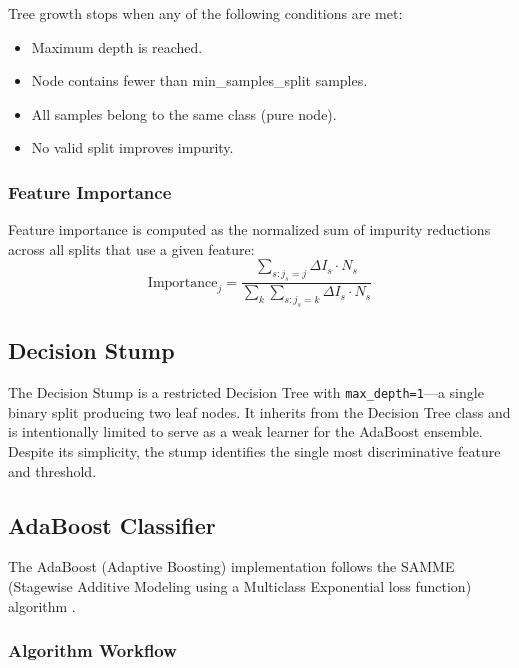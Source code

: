 \documentclass[conference,12pt]{IEEEtran}
\begin{document}
Tree growth stops when any of the following conditions are met:
\begin{itemize}
    \item Maximum depth is reached.
    \item Node contains fewer than min\_samples\_split samples.
    \item All samples belong to the same class (pure node).
    \item No valid split improves impurity.
\end{itemize}

\subsubsection{Feature Importance}

Feature importance is computed as the normalized sum of impurity reductions across all splits that use a given feature:
\begin{equation}
\text{Importance}_j = \frac{\sum_{s: j_s = j} \Delta I_s \cdot N_s}{\sum_{k} \sum_{s: j_s = k} \Delta I_s \cdot N_s}
\end{equation}

\subsection{Decision Stump}

The Decision Stump is a restricted Decision Tree with \texttt{max\_depth=1}---a single binary split producing two leaf nodes. It inherits from the Decision Tree class and is intentionally limited to serve as a weak learner for the AdaBoost ensemble. Despite its simplicity, the stump identifies the single most discriminative feature and threshold.

\subsection{AdaBoost Classifier}

The AdaBoost (Adaptive Boosting) implementation follows the SAMME (Stagewise Additive Modeling using a Multiclass Exponential loss function) algorithm \cite{hastie2009elements, zhu2009multi}.

\subsubsection{Algorithm Workflow}
\end{document}
